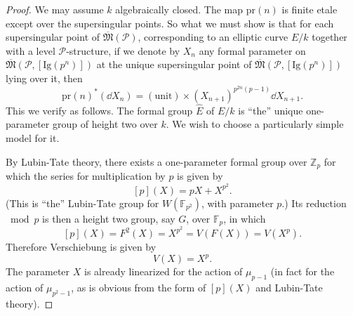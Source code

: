 \begin{proof}
We may assume $k$ algebraically closed. The map $\mathrm{pr}(n)$ is finite etale except over the supersingular points. So what we must show is that for each supersingular point of $\overline{\mathfrak{M}}(\mathcal{P})$, corresponding to an elliptic curve $E/k$ together with a level $\mathcal{P}$-structure, if we denote by $X_n$ any formal parameter on $\overline{\mathfrak{M}}(\mathcal{P}, [\mathrm{Ig}(p^n)])$ at the unique supersingular point of $\overline{\mathfrak{M}}(\mathcal{P}, [\mathrm{Ig}(p^n)])$ lying over it, then
\[
\mathrm{pr}(n)^*(\dd X_n) = (\mathrm{unit}) \times (X_{n+1})^{p^{2n}(p-1)} \dd X_{n+1} .
\]
This we verify as follows. The formal group $\widehat{E}$ of $E/k$ is ``the'' unique one-parameter group of height two over $k$. We wish to choose a particularly simple model for it.

By Lubin-Tate theory, there exists a one-parameter formal group over $\mathbb{Z}_p$ for which the series for multiplication by $p$ is given by
\[
[p](X) = pX + X^{p^2} .
\]
(This is ``the'' Lubin-Tate group for $W(\mathbb{F}_{p^2})$, with parameter $p$.) Its reduction $\bmod p$ is then a height two group, say $G$, over $\mathbb{F}_p$, in which
\[
[p](X) = F^2(X) = X^{p^2} = V(F(X)) = V(X^p) .
\]
Therefore Verschiebung is given by
\[
V(X) = X^p .
\]
The parameter $X$ is already linearized for the action of $\mu_{p-1}$ (in fact for the action of $\mu_{p^2-1}$, as is obvious from the form of $[p](X)$ and Lubin-Tate theory).


\end{proof}

